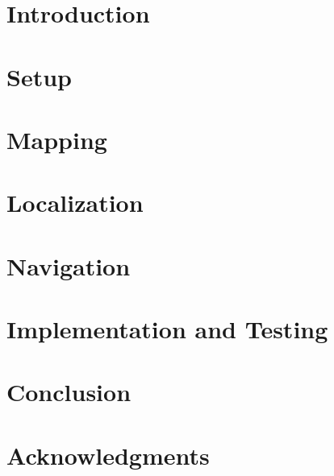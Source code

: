 \documentclass[a4paper,11pt]{article}
\begin{document}


\newpage

\section{Introduction} \label{introduction}


\section{Setup} \label{setup}


\section{Mapping} \label{mapping}


\section{Localization} \label{localization}


\section{Navigation} \label{navigation}


\section{Implementation and Testing} \label{implementation-and-testing}


\section{Conclusion} \label{conclusion}


\newpage
\section*{Acknowledgments} \label{acknowledgments}


\newpage
\printbibliography
\end{document}
